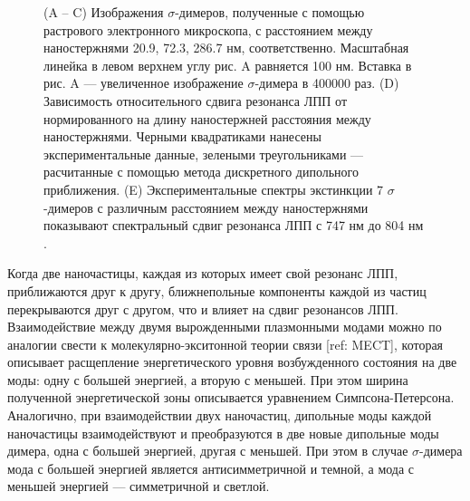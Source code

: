 \begin{figure}[t]
\caption{(A -- C) Изображения $ \sigma $-димеров, полученные с помощью растрового электронного микроскопа, с расстоянием между наностержнями 20.9, 72.3, 286.7 нм, соответственно. Масштабная линейка в левом верхнем углу рис. A равняется 100 нм. Вставка в рис. A --- увеличенное изображение $ \sigma $-димера в 400000 раз. (D) Зависимость относительного сдвига резонанса ЛПП от нормированного на длину наностержней расстояния между наностержнями. Черными квадратиками нанесены экспериментальные данные, зелеными треугольниками --- расчитанные с помощью метода дискретного дипольного приближения. (E) Экспериментальные спектры экстинкции 7 $ \sigma $-димеров с различным расстоянием между наностержнями показывают спектральный сдвиг резонанса ЛПП с 747 нм до 804 нм \cite{nanorods2}.}
\label{img:PR_nanorods}
\end{figure}

Когда две наночастицы, каждая из которых имеет свой резонанс ЛПП, приближаются друг к другу, ближнепольные компоненты каждой из частиц перекрываются друг с другом, что и влияет на сдвиг резонансов ЛПП. Взаимодействие между двумя вырожденными плазмонными модами можно по аналогии свести к молекулярно-экситонной теории связи [ref: MECT], которая описывает расщепление энергетического уровня возбужденного состояния на две моды: одну с большей энергией, а вторую с меньшей. При этом ширина полученной энергетической зоны описывается уравнением Симпсона-Петерсона. Аналогично, при взаимодействии двух наночастиц, дипольные моды каждой наночастицы взаимодействуют и преобразуются в две новые дипольные моды димера, одна с большей энергией, другая с меньшей. При этом в случае $ \sigma $-димера мода с большей энергией является антисимметричной и темной, а мода с меньшей энергией --- симметричной и светлой.

